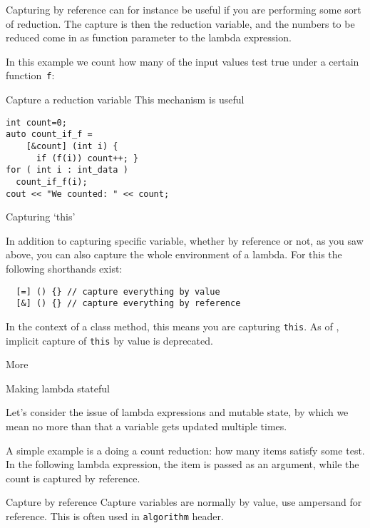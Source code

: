 Capturing by reference can for instance be useful
if you are performing some sort of reduction.
The capture is then the reduction variable,
and the numbers to be reduced come in as function parameter
to the lambda expression.

In this example we count how many of the input values
test true under a certain function~\lstinline{f}:

\begin{block}{Capture a reduction variable}
  \label{sl:capture-count}
This mechanism is useful 
\begin{lstlisting}
int count=0;
auto count_if_f = 
    [&count] (int i) {
      if (f(i)) count++; }
for ( int i : int_data )
  count_if_f(i);
cout << "We counted: " << count;
\end{lstlisting}
\end{block}

 {Capturing `this'}

In addition to capturing specific variable,
whether by reference or not,
as you saw above, you can also capture the whole
environment of a lambda.
For this the following shorthands exist:
\begin{lstlisting}
  [=] () {} // capture everything by value
  [&] () {} // capture everything by reference
\end{lstlisting}
In the context of a class method, this means you are capturing \lstinline{this}.
As of , implicit capture of \lstinline{this} by value
is deprecated.

 {More}

 {Making lambda stateful}

Let's consider the issue of lambda expressions and mutable state,
by which we mean no more than that a variable gets updated
multiple times.

A simple example is a doing a count reduction:
how many items satisfy some test.
In the following lambda expression, the item
is passed as an argument,
while the count is captured by reference.


\begin{slide}{Capture by reference}
  \label{sl:lambda-count}
  Capture variables are normally by value,
  use ampersand for reference.
  This is often used in \lstinline{algorithm} header.
\end{slide}

